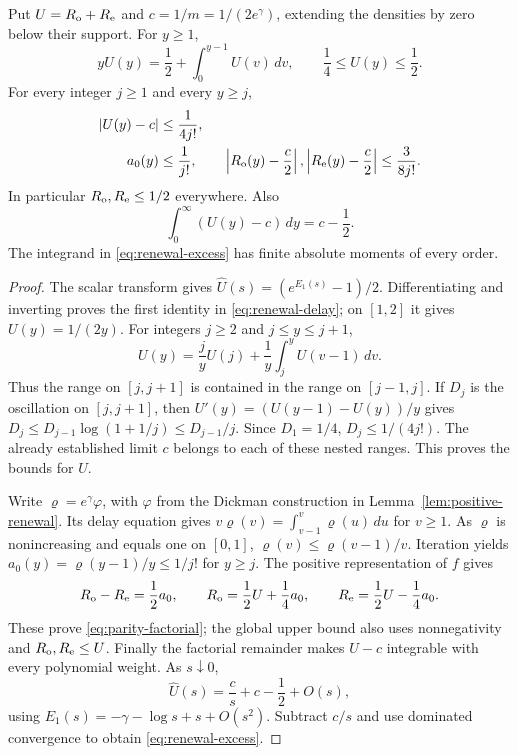 \documentclass[11pt,letterpaper]{article}
\begin{document}
\begin{lemma}\label{lem:factorial-renewal}
Put $U=R_{\rm o}+R_{\rm e}$ and $c=1/m=1/(2e^\gamma)$, extending the
densities by zero below their support. For $y\ge1$,
\begin{equation}\label{eq:renewal-delay}
 yU(y)=\frac12+\int_0^{y-1}U(v)\,dv,\qquad
 \frac14\le U(y)\le\frac12.
\end{equation}
For every integer $j\ge1$ and every $y\ge j$,
\begin{align}
 |U(y)-c|&\le\frac1{4j!},\label{eq:renewal-factorial}\\
 a_0(y)&\le\frac1{j!},\qquad
 \left|R_{\rm o}(y)-\frac c2\right|,
 \left|R_{\rm e}(y)-\frac c2\right|
 \le\frac3{8j!}.\label{eq:parity-factorial}
\end{align}
In particular $R_{\rm o},R_{\rm e}\le1/2$ everywhere. Also
\begin{equation}\label{eq:renewal-excess}
 \int_0^\infty(U(y)-c)\,dy=c-\frac12.
\end{equation}
The integrand in \eqref{eq:renewal-excess} has finite absolute moments
of every order.
\end{lemma}
\begin{proof}
The scalar transform gives
$\widehat U(s)=(e^{E_1(s)}-1)/2$. Differentiating and inverting proves
the first identity in \eqref{eq:renewal-delay}; on $[1,2]$ it gives
$U(y)=1/(2y)$. For integers $j\ge2$ and $j\le y\le j+1$,
\[
 U(y)=\frac jyU(j)+\frac1y\int_j^yU(v-1)\,dv.
\]
Thus the range on $[j,j+1]$ is contained in the range on $[j-1,j]$.
If $D_j$ is the oscillation on $[j,j+1]$, then
$U'(y)=(U(y-1)-U(y))/y$ gives
$D_j\le D_{j-1}\log(1+1/j)\le D_{j-1}/j$.
Since $D_1=1/4$, $D_j\le1/(4j!)$. The already established limit $c$
belongs to each of these nested ranges. This proves the bounds for $U$.

Write $\varrho=e^\gamma\varphi$, with $\varphi$ from the Dickman
construction in Lemma~\ref{lem:positive-renewal}. Its delay equation gives
$v\varrho(v)=\int_{v-1}^v\varrho(u)\,du$ for $v\ge1$.
As $\varrho$ is nonincreasing and equals one on $[0,1]$,
$\varrho(v)\le\varrho(v-1)/v$. Iteration yields
$a_0(y)=\varrho(y-1)/y\le1/j!$ for $y\ge j$.
The positive representation of $f$ gives
\[
 R_{\rm o}-R_{\rm e}=\frac12a_0,
 \qquad R_{\rm o}=\frac12U+\frac14a_0,
 \qquad R_{\rm e}=\frac12U-\frac14a_0.
\]
These prove \eqref{eq:parity-factorial}; the global upper bound also
uses nonnegativity and $R_{\rm o},R_{\rm e}\le U$.
Finally the factorial remainder makes $U-c$ integrable with every
polynomial weight. As $s\downarrow0$,
\[
 \widehat U(s)=\frac c s+c-\frac12+O(s),
\]
using $E_1(s)=-\gamma-\log s+s+O(s^2)$. Subtract $c/s$ and use
dominated convergence to obtain \eqref{eq:renewal-excess}.
\end{proof}
\end{document}

